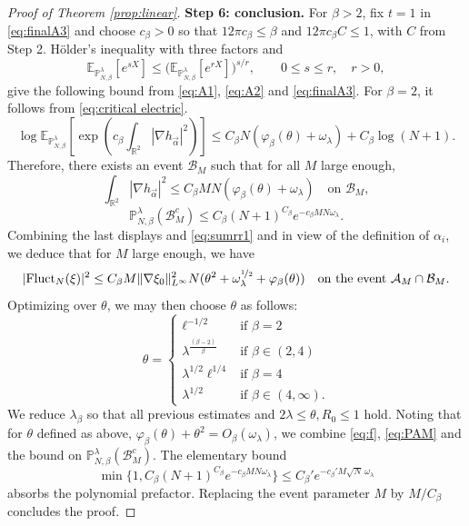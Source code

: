 \documentclass[a4paper,10pt,leqno]{amsart}
\numberwithin{equation}{section}
\newcommand{\R}{\mathbb{R}}
\def\Esp{\mathbb{E}}
\def\mc{\mathcal}
\def\P{\mathbb{P}_{N,\beta}^{\lambda}}
\def\Fluct{\mathrm{Fluct}}
\begin{document}
\begin{proof}[Proof of Theorem \ref{prop:linear}]
  \smallskip
  \noindent
  \textbf{Step 6: conclusion.} For $\beta>2$, fix $t=1$ in \eqref{eq:finalA3} and choose $c_\beta>0$ so that $12\pi c_\beta\le\beta$ and $12\pi c_\beta C\le1$, with $C$ from Step 2. H\"older's inequality with three factors and
  \[
    \Esp_{\P}[e^{sX}]\le\bigl(\Esp_{\P}[e^{rX}]\bigr)^{s/r},\qquad 0\le s\le r,\quad r>0,
  \]
  give the following bound from \eqref{eq:A1}, \eqref{eq:A2} and \eqref{eq:finalA3}. For $\beta=2$, it follows from \eqref{eq:critical electric}.
  \begin{equation*}
    \log\Esp_{\P}\left[\exp\left(c_\beta \int_{\R^2} |\nabla h_{\vec{\alpha}}|^2 \right)\right]\leq C_\beta N(\varphi_\beta(\theta)+\omega_\lambda)+C_\beta\log(N+1).
  \end{equation*}
  Therefore, there exists an event $\mc{B}_M$ such that for all $M$ large enough,
  \begin{equation*}
    \int_{\R^2} |\nabla h_{\vec{\alpha}}|^2\leq C_\beta M N (\varphi_\beta(\theta)+\omega_\lambda)\quad\text{on }\mc B_M,
  \end{equation*}
  \begin{equation*}
    \P(\mc{B}_M^c)\leq C_\beta (N+1)^{C_\beta}e^{-c_\beta M N\omega_\lambda}.
  \end{equation*}
  Combining the last displays and \eqref{eq:sumrr1} and in view of the definition of $\alpha_i$, we deduce that for $M$ large enough, we have
  \begin{equation}\label{eq:f}
    |\Fluct_N(\xi)|^2\leq C_\beta M\Vert \nabla \xi_0 \Vert_{L^{\infty}}^2N({\theta}^2+\omega_\lambda^{\nicefrac{1}{2}}+\varphi_\beta(\theta))\quad \text{on the event $\mc{A}_M\cap \mc{B}_M$.}
  \end{equation}
  Optimizing over $\theta$, we may then choose $\theta$ as follows:
  \begin{equation*}
    \theta=\begin{cases}
      \ell^{-1/2} &\text{if $\beta=2$}\\
      \lambda^{\frac{(\beta-2)}{\beta}}& \text{if $\beta\in (2,4)$}\\
      \lambda^{1/2}\ell^{1/4}& \text{if $\beta=4$}\\
      \lambda^{1/2}& \text{if $\beta\in (4,\infty)$}.
    \end{cases}
  \end{equation*}
  We reduce $\lambda_\beta$ so that all previous estimates and $2\lambda\le\theta,R_0\le1$ hold. Noting that for $\theta$ defined as above,
  $\varphi_\beta(\theta)+\theta^2=O_\beta(\omega_\lambda)$, we combine \eqref{eq:f}, \eqref{eq:PAM} and the bound on $\P(\mc B_M^c)$. The elementary bound
  \[
    \min\{1,C_\beta(N+1)^{C_\beta}e^{-c_\beta MN\omega_\lambda}\}
    \le C_\beta'e^{-c_\beta'M\sqrt N\,\omega_\lambda}
  \]
  absorbs the polynomial prefactor. Replacing the event parameter $M$ by $M/C_\beta$ concludes the proof.
\end{proof}


\end{document}
